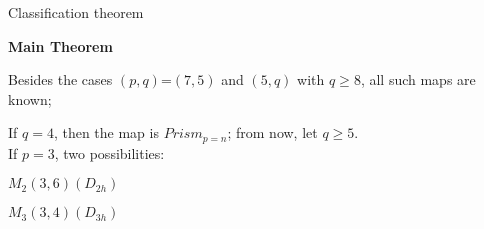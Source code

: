 \documentclass[%
pdf,
colorBG,
slideColor,
]{prosper}
\begin{document}
\begin{slide}{Classification theorem}
{\it 

{\bf Main Theorem}

Besides the cases $(p,q)$=$(7,5)$ and $(5,q)$ with $q\geq 8$, all such maps are known;
}


If $q=4$, then the map is $Prism_{p=n}$; from now, let $q\geq 5$.\\[2mm]

If $p=3$, two possibilities:
\begin{center}
\begin{minipage}{3cm}
\centering
{}\par
$M_{2}(3,6)(D_{2h})$
\end{minipage}
\begin{minipage}{3cm}
\centering
{}\par
$M_{3}(3,4)(D_{3h})$
\end{minipage}
\end{center}


\end{slide}
\end{document}
